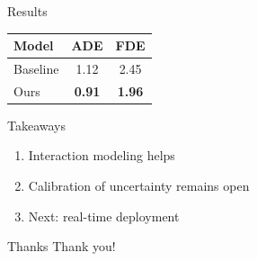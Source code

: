 \documentclass[aspectratio=169,10pt]{beamer}
\begin{document}
\begin{frame}{Results}
  \begin{table}
    \centering
    \begin{tabular}{lcc}
      \toprule
      Model & ADE & FDE \\
      \midrule
      Baseline & 1.12 & 2.45 \\
      Ours & \textbf{0.91} & \textbf{1.96} \\
      \bottomrule
    \end{tabular}
  \end{table}
\end{frame}

\begin{frame}{Takeaways}
  \begin{enumerate}
    \item Interaction modeling helps
    \item Calibration of uncertainty remains open
    \item Next: real-time deployment
  \end{enumerate}
\end{frame}

\begin{frame}{Thanks}
  \centering
  {\Large Thank you!}
\end{frame}
\end{document}
